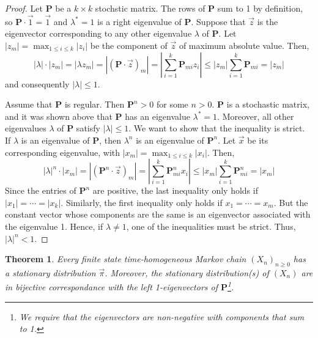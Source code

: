 \documentclass{tufte-handout}
\newtheorem{thm}{Theorem}
\begin{document}
  \begin{proof}
    Let $\boldsymbol{P}$ be a $k \times k$ stochstic matrix. The rows of $\boldsymbol{P}$ sum to 1 by definition, so $\boldsymbol{P} \cdot \Vec{1} = \Vec{1}$ and $\lambda^* = 1$ is a right eigenvalue of $\boldsymbol{P}$. Suppose that $\Vec{z}$ is the eigenvector corresponding to any other eigenvalue $\lambda$ of $\boldsymbol{P}$. Let $|z_m| = \max_{1 \leq i \leq k} |z_i|$ be the component of $\Vec{z}$ of maximum absolute value. Then,
    \[
    |\lambda| \cdot |z_m| = |\lambda z_m| = |(\boldsymbol{P} \cdot \Vec{z})_m| = |\sum_{i = 1}^{k} \boldsymbol{P}_{mi}z_i| \leq |z_m| \sum_{i = 1}^{k} \boldsymbol{P}_{mi} = |z_m|
    \]
    \noindent and consequently $|\lambda| \leq 1$.

    Assume that $\boldsymbol{P}$ is regular. Then $\boldsymbol{P}^n > 0$ for some $n > 0$. $\boldsymbol{P}$ is a stochastic matrix, and it was shown above that $\boldsymbol{P}$ has an eigenvalue $\lambda^* = 1$. Moreover, all other eigenvalues $\lambda$ of $\boldsymbol{P}$ satisfy $|\lambda| \leq 1$. We want to show that the inequality is strict. If $\lambda$ is an eigenvalue of $\boldsymbol{P}$, then $\lambda^n$ is an eigenvalue of $\boldsymbol{P}^n$. Let $\Vec{x}$ be its corresponding eigenvalue, with $|x_m| = \max_{1 \leq i \leq k} |x_i|$. Then,
    \[
    |\lambda|^n \cdot |x_m| = |(\boldsymbol{P}^n \cdot \Vec{z})_m| = |\sum_{i = 1}^{k} \boldsymbol{P}^n_{mi}x_i| \leq |x_m| \sum_{i = 1}^{k} \boldsymbol{P}^n_{mi} = |x_m|
    \]
    \noindent Since the entries of $\boldsymbol{P}^n$ are positive, the last inequality only holds if $|x_1| = \cdots = |x_k|$. Similarly, the first inequality only holds if $x_1 = \cdots = x_m$. But the constant vector whose components are the same is an eigenvector associated with the eigenvalue 1. Hence, if $\lambda \neq 1$, one of the inequalities must be strict. Thus, $|\lambda|^n < 1$.
  \end{proof}

  \begin{thm}
   Every finite state time-homogeneous Markov chain $(X_n)_{n \geq 0}$ has a stationary distribution $\Vec{\pi}$. Moreover, the stationary distribution(s) of $(X_n)$ are in bijective correspondance with the left 1-eigenvectors of $\boldsymbol{P}$\footnote{We require that the eigenvectors are non-negative with components that sum to 1.}.
  \end{thm}
\end{document}
